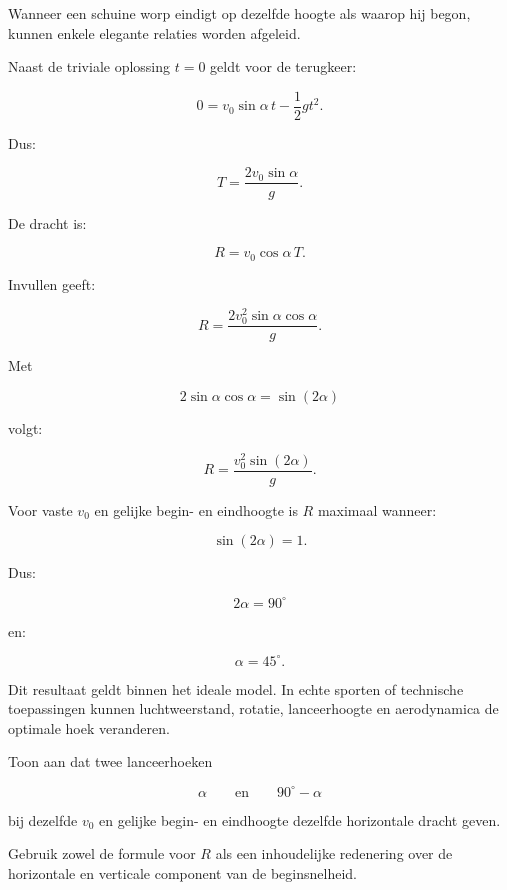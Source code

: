 \documentclass{ximera}
\begin{document}
Wanneer een schuine worp eindigt op dezelfde hoogte als waarop hij
begon, kunnen enkele elegante relaties worden afgeleid.

Naast de triviale oplossing $t=0$ geldt voor de terugkeer:

\[
0
=
v_0\sin\alpha\,t-\frac12gt^2.
\]

Dus:

\[
\boxed{
T
=
\frac{2v_0\sin\alpha}{g}.
}
\]

De dracht is:

\[
R
=
v_0\cos\alpha\,T.
\]

Invullen geeft:

\[
R
=
\frac{2v_0^2\sin\alpha\cos\alpha}{g}.
\]

Met

\[
2\sin\alpha\cos\alpha=\sin(2\alpha)
\]

volgt:

\[
\boxed{
R
=
\frac{v_0^2\sin(2\alpha)}{g}.
}
\]



Voor vaste $v_0$ en gelijke begin- en eindhoogte is $R$ maximaal
wanneer:

\[
\sin(2\alpha)=1.
\]

Dus:

\[
2\alpha=90^\circ
\]

en:

\[
\boxed{
\alpha=45^\circ.
}
\]

Dit resultaat geldt binnen het ideale model. In echte sporten of
technische toepassingen kunnen luchtweerstand, rotatie, lanceerhoogte
en aerodynamica de optimale hoek veranderen.


\begin{oefening}{\oefG}

Toon aan dat twee lanceerhoeken

\[
\alpha
\qquad\text{en}\qquad
90^\circ-\alpha
\]

bij dezelfde $v_0$ en gelijke begin- en eindhoogte dezelfde
horizontale dracht geven.

Gebruik zowel de formule voor $R$ als een inhoudelijke redenering over
de horizontale en verticale component van de beginsnelheid.

\end{oefening}
\end{document}
